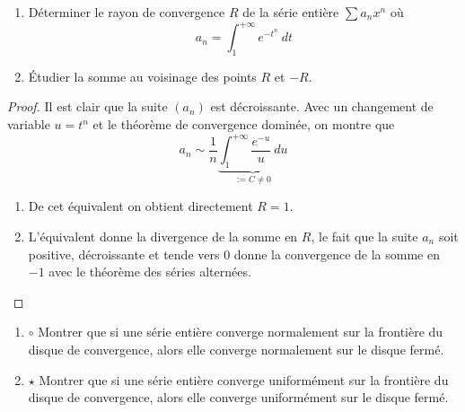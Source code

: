 \documentclass[french,a4paper]{article}
\theoremstyle{plain}
\theoremstyle{definition}
\theoremstyle{remark}
\begin{document}
\begin{ex}[Moulin.SE.52]{}
	\begin{enumerate}
		\item Déterminer le rayon de convergence $R$ de la série entière $\sum a_nx^n$ où $$a_n=\int_{1}^{+\infty}e^{-t^n}\ dt$$
		\item Étudier la somme au voisinage des points $R$ et $-R$.
	\end{enumerate}
\end{ex}
\begin{proof}
	Il est clair que la suite $(a_n)$ est décroissante. Avec un changement de variable $u=t^n$ et le théorème de convergence dominée, on montre que $$a_n\sim\frac{1}{n}\underbrace{\int_{1}^{+\infty}\frac{e^{-u}}{u}\ du}_{:= C\ne 0}$$
	\begin{enumerate}
		\item De cet équivalent on obtient directement $R=1$.
		\item L'équivalent donne la divergence de la somme en $R$, le fait que la suite $a_n$ soit positive, décroissante et tende vers $0$ donne la convergence de la somme en $-1$ avec le théorème des séries alternées.
	\end{enumerate}
\end{proof}

\begin{ex}[Moulin.SE.53]{}
	\begin{enumerate}
		\item $\circ$ Montrer que si une série entière converge normalement sur la frontière du disque de convergence, alors elle converge normalement sur le disque fermé.
		\item $\star$ Montrer que si une série entière converge uniformément sur la frontière du disque de convergence, alors elle converge uniformément sur le disque fermé.
	\end{enumerate}
\end{ex}
\end{document}
